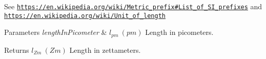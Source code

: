 See \href{https://en.wikipedia.org/wiki/Metric_prefix#List_of_SI_prefixes}{\tt https\+://en.\+wikipedia.\+org/wiki/\+Metric\+\_\+prefix\#\+List\+\_\+of\+\_\+\+S\+I\+\_\+prefixes} and \href{https://en.wikipedia.org/wiki/Unit_of_length}{\tt https\+://en.\+wikipedia.\+org/wiki/\+Unit\+\_\+of\+\_\+length} 
\begin{DoxyParams}{Parameters}
{\em length\+In\+Picometer} & $ l_{pm}\ (pm)$ Length in picometers. \\
\hline
\end{DoxyParams}
\begin{DoxyReturn}{Returns}
$ l_{Zm}\ (Zm)$ Length in zettameters. 
\end{DoxyReturn}
